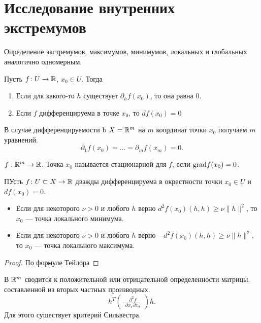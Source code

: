\section{Исследование внутренних экстремумов}
\begin{defn}
    Определение экстремумов, максимумов, минимумов, локальных и глобальных аналогично одномерным.
\end{defn}
\begin{thm}
    Пусть $ f\colon U \to  \mathbb{R}$, $ x_0 \in U$. Тогда
    \begin{enumerate}[noitemsep]
	\item Если для какого-то $ h$ существует  $ \partial _h f(x_0)$, то она равна 0.
	\item Если $ f$ дифференцируема в точке  $ x_0$, то $ df(x_0) = 0$
    \end{enumerate}
\end{thm}
\begin{note}
    В случае дифференцируемости b $ X = \mathbb{R}^{m}$ на $ m$ координат точки  $ x_0$ получаем $ m$ уравнений.
    \[
	\partial _1 f(x_0) = \ldots = \partial _m f(x_m) = 0
    .\] 
\end{note}
\begin{defn}
    $ f: \mathbb{R}^{m } \to  \mathbb{R}$.
    Точка $ x_0$ называется {\sf   стационарной} для $ f$, если  $ {\mathop{\text{\rm grad}}} f(x_0) = 0$.
\end{defn}
\begin{thm}
    ПУсть $ f\colon U \subset X \to  \mathbb{R}$ дважды дифференцируема в окрестности точки $ x_0 \in  U$ и $ df(x_0) = 0$.
    \begin{itemize}[noitemsep]
	\item Если для некоторого $ \nu >0 $ и любого  $ h$ верно $ d^2f(x_0) (h, h) \ge  \nu \| h \|^2 $, то $ x_0$ --- точка локального минимума.
	\item Если для некоторого $ \nu >0 $ и любого  $ h$ верно $ -d^2f(x_0) (h, h) \ge  \nu \| h \|^2 $, то $ x_0$ --- точка локального максимума.
    \end{itemize}
\end{thm}
\begin{proof}
    По формуле Тейлора
\end{proof}
\begin{note}
    В $ \mathbb{R}^{m}$ сводится к положительной или отрицательной определенности матрицы, составленной из вторых частных производных. 
    \[
    h^{T} 
    \begin{pmatrix}
    \frac{\partial ^2f}{\partial x_1 \partial x_2} 
    \end{pmatrix}
    h
    .\] 
    Для этого существует критерий Сильвестра.
\end{note}
% 
